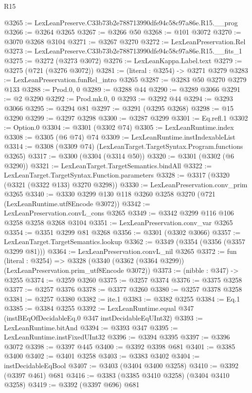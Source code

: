 \begin{lexlean}{R15}
\begin{coremodule}
@3265 := LexLeanPreserve.C33b73b2e788713990dfe94c58c97a86e.R15.__prog
@3266 := @3264 @3265
@3267 := @3266 @50
@3268 := @101 @3072
@3270 := @3070 @3268 @3104
@3271 := @3267 @3270
@3272 := LexLeanPreservation.Rel
@3273 := LexLeanPreserve.C33b73b2e788713990dfe94c58c97a86e.R15.__fits_1
@3275 := @3272 (@3273 @3072)
@3276 := LexLeanKappa.Label.text
@3279 := @3275 (@721 (@3276 @3072))
@3281 := (literal : @3254) -> @3271 @3279
@3283 := LexLeanPreservation.funRel_intro @3265
@3287 := @3283 @50 @3270 @3279 @133
@3288 := Prod.{0, 0}
@3289 := @3288 @44
@3290 := @3289 @3066
@3291 := @2 @3290
@3292 := Prod.mk.{0, 0}
@3293 := @3292 @44
@3294 := @3293 @3066
@3295 := @3294 @81
@3297 := @3291 (@3295 @3268)
@3298 := @15 @3290
@3299 := @3297 @3298
@3300 := @3287 @3299
@3301 := Eq.refl.{1}
@3302 := Option.{0}
@3304 := @3301 (@3302 @74)
@3305 := LexLeanRuntime.index
@3308 := @3305 (@6 @74) @74
@3309 := LexLeanRuntime.instIndexableList
@3314 := @3308 (@3309 @74) (LexLeanTarget.TargetSyntax.Program.functions @3265)
@3317 := @3300 (@3304 (@3314 @50))
@3320 := @3301 (@3302 (@6 @3290))
@3321 := LexLeanTarget.TargetSemantics.bindAll
@3322 := LexLeanTarget.TargetSyntax.Function.parameters
@3328 := @3317 (@3320 (@3321 (@3322 @133) @3270 @3298))
@3330 := LexLeanPreservation.conv_prim @3265
@3340 := @3330 @3299 @130 @118 @3260 @3258 @3270 (@721 (LexLeanRuntime.utf8Encode @3072))
@3342 := LexLeanPreservation.convL_cons @3265
@3349 := @3342 @3299 @116 @106 @3258 @3258 @3268 @3104
@3351 := LexLeanPreservation.conv_var @3265
@3354 := @3351 @3299 @81 @3268
@3356 := @3301 (@3302 @3066)
@3357 := LexLeanTarget.TargetSemantics.lookup
@3362 := @3349 (@3354 (@3356 (@3357 @3299 @81)))
@3364 := LexLeanPreservation.convL_nil @3265
@3372 := fun (literal : @3254) =>
  @3328 (@3340 (@3362 (@3364 @3299)) (LexLeanPreservation.prim_utf8Encode @3072))
@3373 := (nibble : @347) -> @3255
@3374 := @3259 @3260
@3375 := @3257 @3374
@3376 := @3375 @3258
@3377 := @3257 @3376
@3378 := @3377 @3260
@3380 := @3257 @3378 @3258
@3381 := @3257 @3380
@3382 := ite.{1}
@3383 := @3382 @3255
@3384 := Eq.{1}
@3385 := @3384 @3255
@3392 := LexLeanRuntime.equal @347 (instBEqOfDecidableEq.{0} @347 instDecidableEqUInt32)
@3393 := LexLeanRuntime.bitAnd
@3394 := @3393 @347
@3395 := LexLeanRuntime.instFixedUInt32
@3396 := @3394 @3395
@3397 := @3396 @3072
@3398 := @3397 @445
@3400 := @3392 @3398 @681
@3401 := @3385 @3400
@3402 := @3401 @3258
@3403 := @3383 @3402
@3404 := instDecidableEqBool
@3407 := @3403 (@3404 @3400 @3258)
@3410 := @3392 (@3397 @461) @681
@3416 := @3383 (@3385 @3410 @3258) (@3404 @3410 @3258)
@3419 := @3392 (@3397 @696) @681

\end{coremodule}
\end{lexlean}
